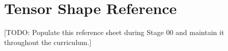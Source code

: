 
\section*{Tensor Shape Reference}

[TODO: Populate this reference sheet during Stage 00 and maintain it throughout the curriculum.]
